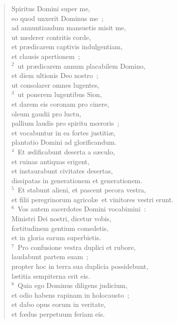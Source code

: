 \begin{flushleft}\begin{verse}\vspace{-19pt}\hspace{6pt}Spiritus Domini super me,\\\hspace{6pt} eo quod unxerit Dominus me~;\\ ad annuntiandum mansuetis misit me,\\ ut mederer contritis corde,\\ et pr\ae dicarem captivis indulgentiam,\\ et clausis apertionem~;\\
${}^{2}$~ut pr\ae dicarem annum placabilem Domino,\\ et diem ultionis Deo nostro~;\\ ut consolarer omnes lugentes,\\
${}^{3}$~ut ponerem lugentibus Sion,\\ et darem eis coronam pro cinere,\\ oleum gaudii pro luctu,\\ pallium laudis pro spiritu mœroris~;\\ et vocabuntur in ea fortes justiti\ae ,\\ plantatio Domini ad glorificandum.\\
${}^{4}$~Et \ae dificabunt deserta a s\ae culo,\\ et ruinas antiquas erigent,\\ et instaurabunt civitates desertas,\\ dissipatas in generationem et generationem.\\
${}^{5}$~Et stabunt alieni, et pascent pecora vestra,\\ et filii peregrinorum agricol\ae\ et vinitores vestri erunt.\\
${}^{6}$~Vos autem sacerdotes Domini vocabimini~:\\ Ministri Dei nostri, dicetur vobis,\\ fortitudinem gentium comedetis,\\ et in gloria earum superbietis.\\
${}^{7}$~Pro confusione vestra duplici et rubore,\\ laudabunt partem suam~;\\ propter hoc in terra sua duplicia possidebunt,\\ l\ae titia sempiterna erit eis.\\
${}^{8}$~Quia ego Dominus diligens judicium,\\ et odio habens rapinam in holocausto~;\\ et dabo opus eorum in veritate,\\ et fœdus perpetuum feriam eis.\\

\end{verse}
\end{flushleft}
